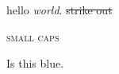 \documentclass{article}
\begin{document}
hello \emph{world}.
\sout{strike out}

\textsc{small caps}

\color{blue}   Is this blue.


\end{document}
